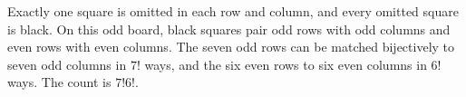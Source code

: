 Exactly one square is omitted in each row and column, and every omitted square is black. On this odd board, black squares pair odd rows with odd columns and even rows with even columns. The seven odd rows can be matched bijectively to seven odd columns in $7!$ ways, and the six even rows to six even columns in $6!$ ways. The count is $\boxed{7!6!}$.
